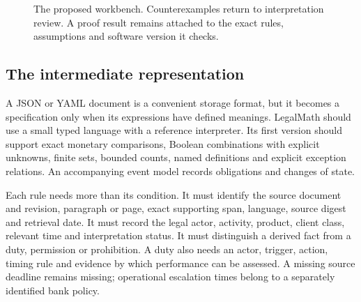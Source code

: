 \begin{figure}[htbp]
\centering
{}
\caption{The proposed workbench. Counterexamples return to interpretation review.
A proof result remains attached to the exact rules, assumptions and software
version it checks.}
\label{fig:architecture}
\end{figure}

\subsection{The intermediate representation}

A JSON or YAML document is a convenient storage format, but it becomes a
specification only when its expressions have defined meanings. LegalMath should
use a small typed language with a reference interpreter. Its first version should
support exact monetary comparisons, Boolean combinations with explicit unknowns,
finite sets, bounded counts, named definitions and explicit exception relations.
An accompanying event model records obligations and changes of state.

Each rule needs more than its condition. It must identify the source document and
revision, paragraph or page, exact supporting span, language, source digest and
retrieval date. It must record the legal actor, activity, product, client class,
relevant time and interpretation status. It must distinguish a derived fact from
a duty, permission or prohibition. A duty also needs an actor, trigger, action,
timing rule and evidence by which performance can be assessed. A missing source
deadline remains missing; operational escalation times belong to a separately
identified bank policy.

